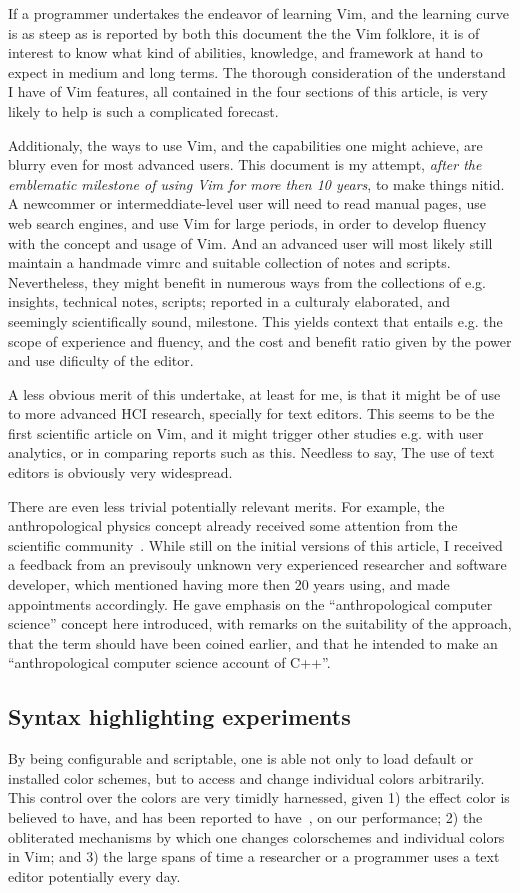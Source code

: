 \documentclass{article}
\begin{document}
If a programmer undertakes the endeavor
of learning Vim, and the learning curve is
as steep as is reported by both this document
the the Vim folklore,
it is of interest to know what kind of abilities,
knowledge, and framework at hand to expect in medium and long
terms.
The thorough consideration of the understand I have of
Vim features, all contained in the four sections of this article,
is very likely to help is such a complicated forecast.

Additionaly,
the ways to use Vim, and the capabilities one might achieve,
are blurry even for most advanced users.
This document is my attempt, \emph{after the emblematic milestone of using Vim for more then 10 years}, to make things nitid.
A newcommer or intermeddiate-level user
will need to read manual pages, use web search engines,
and use Vim for large periods, in order to develop
fluency with the concept and usage of Vim.
And an advanced user will most likely still maintain
a handmade vimrc and suitable collection of notes and scripts.
Nevertheless, they might benefit in numerous ways from the collections of
e.g. insights, technical notes, scripts;
reported in a culturaly elaborated,
and seemingly scientifically sound, milestone.
This yields context that entails e.g. the scope of experience
and fluency,
and the cost and benefit ratio given by the power
and use dificulty of the editor.

A less obvious merit of this undertake,
at least for me,
is that it might be of use to more advanced
HCI research, specially for text editors.
This seems to be the first scientific article on Vim,
and it might trigger other studies e.g. with user analytics,
or in comparing reports such as this.
Needless to say, The use of text editors is obviously very widespread.

There are even less trivial potentially relevant merits.
For example, the anthropological physics concept already received
some attention from the scientific community~\cite{anPhy,anPhy2,thesis}.
While still on the initial versions of this article,
I received a feedback from an previsouly unknown very experienced
researcher and software developer, which mentioned having
more then 20 years using, and made appointments accordingly.
He gave emphasis on the ``anthropological computer science''
concept here introduced, with remarks on the suitability of the
approach, that the term should have been coined earlier,
and that he intended to make an ``anthropological computer science account of C++''.

\subsection{Syntax highlighting experiments}\label{visual3}
By being configurable and scriptable, one is able not
only to load default or installed color schemes,
but to access and change individual colors arbitrarily.
This control over the colors are very timidly harnessed,
given 1) the effect color is believed to have,
and has been reported to have~\cite{}, on our performance;
2) the obliterated mechanisms by which one changes colorschemes
and individual colors in Vim; and 3) the large spans of time
a researcher or a programmer uses a text editor potentially every day.
\end{document}
